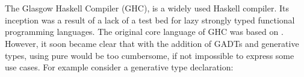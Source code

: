 \documentclass[manuscript,screen,nonacm]{acmart}
\begin{document}



\section{\SFC}\label{sec:sfc}
The Glasgow Haskell Compiler (GHC)\cite{ghc_2020}, is a widely used Haskell\cite{haskell_2010} compiler. Its inception was a result of a lack of a test bed for lazy strongly typed functional programming languages. The original core language of GHC was based on \SF. However, it soon became clear that with the addition of GADTs and generative types, using pure \SF would be too cumbersome, if not impossible to express some use cases. For example consider a generative type declaration:
\end{document}
